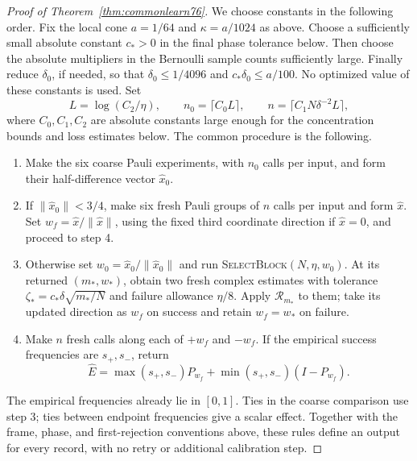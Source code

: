\begin{proof}[Proof of Theorem~\ref{thm:commonlearn76}]
We choose constants in the following order.  Fix the local cone
$a=1/64$ and $\kappa=a/1024$ as above.  Choose a sufficiently small
absolute constant $c_*>0$ in the final phase tolerance below.
Then choose the absolute multipliers in the Bernoulli sample counts
sufficiently large.  Finally reduce $\delta_0$, if needed, so that
$\delta_0\le1/4096$ and $c_*\delta_0\le a/100$.  No optimized
value of these constants is used.  Set
\begin{equation}\label{eq:learnpublicsamples77}
 L=\log(C_2/\eta),\qquad
 n_0=\lceil C_0L\rceil,\qquad
 n=\lceil C_1N\delta^{-2}L\rceil,
\end{equation}
where $C_0,C_1,C_2$ are absolute constants large enough for the
concentration bounds and loss estimates below.  The common procedure
is the following.
\begin{enumerate}
\item Make the six coarse Pauli experiments, with $n_0$ calls per
 input, and form their half-difference vector $\widehat x_0$.
\item If $\|\widehat x_0\|<3/4$, make six fresh Pauli groups of
 $n$ calls per input and form $\widehat x$.  Set
 $w_f=\widehat x/\|\widehat x\|$, using the fixed third coordinate
 direction if $\widehat x=0$, and proceed to step 4.
\item Otherwise set $w_0=\widehat x_0/\|\widehat x_0\|$ and run
 \textsc{SelectBlock}$(N,\eta,w_0)$.  At its returned $(m_*,w_*)$,
 obtain two fresh complex estimates with tolerance
 $\zeta_*=c_*\delta\sqrt{m_*/N}$ and failure allowance $\eta/8$.
 Apply $\mathcal R_{m_*}$ to them; take its updated direction as
 $w_f$ on success and retain $w_f=w_*$ on failure.
\item Make $n$ fresh calls along each of $+w_f$ and $-w_f$.
 If the empirical success frequencies are $s_+,s_-$, return
 \[
   \widehat E=\max(s_+,s_-)P_{w_f}
                  +\min(s_+,s_-)(I-P_{w_f}).
 \]
\end{enumerate}
The empirical frequencies already lie in $[0,1]$.  Ties in the
coarse comparison use step 3; ties between endpoint frequencies
give a scalar effect.  Together with the frame, phase, and
first-rejection conventions above, these rules define an output
for every record, with no retry or additional calibration step.


\end{proof}
